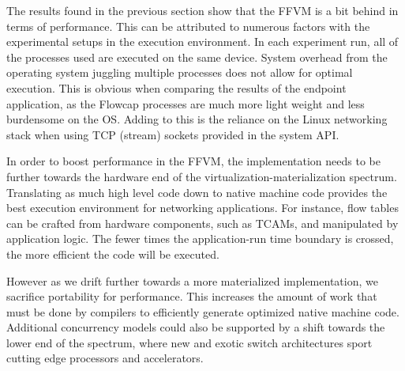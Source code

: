 
The results found in the previous section show that the FFVM is a bit behind in terms of performance. This can be attributed to numerous factors with the experimental setups in the execution environment. In each experiment run, all of the processes used are executed on the same device. System overhead from the operating system juggling multiple processes does not allow for optimal execution. This is obvious when comparing the results of the endpoint application, as the Flowcap processes are much more light weight and less burdensome on the OS. Adding to this is the reliance on the Linux networking stack when using TCP (stream) sockets provided in the system API.


In order to boost performance in the FFVM, the implementation needs to be further towards the hardware end of the virtualization-materialization spectrum. Translating as much high level code down to native machine code provides the best execution environment for networking applications. For instance, flow tables can be crafted from hardware components, such as TCAMs, and manipulated by application logic. The fewer times the application-run time boundary is crossed, the more efficient the code will be executed. 


However as we drift further towards a more materialized implementation, we sacrifice portability for performance. This increases the amount of work that must be done by compilers to efficiently generate optimized native machine code. Additional concurrency models could also be supported by a shift towards the lower end of the spectrum, where new and exotic switch architectures sport cutting edge processors and accelerators.


